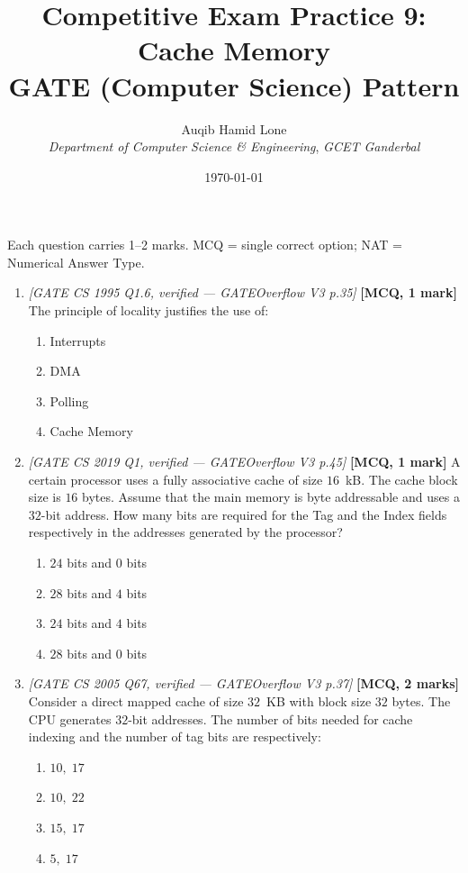 \documentclass[11pt]{article}
\title{Competitive Exam Practice 9: Cache Memory\\\large GATE (Computer Science) Pattern}
\author{Auqib Hamid Lone\\[0.3em]
  \emph{Department of Computer Science \& Engineering}, \emph{GCET Ganderbal}}
\date{\today}
\begin{document}
\maketitle

\noindent Each question carries 1--2 marks. MCQ = single correct option; NAT = Numerical Answer Type.

\begin{enumerate}
\item[\textbf{Q1}] \textit{[GATE CS 1995 Q1.6, verified --- GATEOverflow V3 p.35]} \textbf{[MCQ, 1 mark]} The principle of locality justifies the use of:
\begin{enumerate}
  \item[(A)] Interrupts
  \item[(B)] DMA
  \item[(C)] Polling
  \item[(D)] Cache Memory
\end{enumerate}

\item[\textbf{Q2}] \textit{[GATE CS 2019 Q1, verified --- GATEOverflow V3 p.45]} \textbf{[MCQ, 1 mark]} A certain processor uses a fully associative cache of size $16$~kB. The cache block size is $16$ bytes. Assume that the main memory is byte addressable and uses a $32$-bit address. How many bits are required for the Tag and the Index fields respectively in the addresses generated by the processor?
\begin{enumerate}
  \item[(A)] $24$ bits and $0$ bits
  \item[(B)] $28$ bits and $4$ bits
  \item[(C)] $24$ bits and $4$ bits
  \item[(D)] $28$ bits and $0$ bits
\end{enumerate}

\item[\textbf{Q3}] \textit{[GATE CS 2005 Q67, verified --- GATEOverflow V3 p.37]} \textbf{[MCQ, 2 marks]} Consider a direct mapped cache of size $32$~KB with block size $32$ bytes. The CPU generates $32$-bit addresses. The number of bits needed for cache indexing and the number of tag bits are respectively:
\begin{enumerate}
  \item[(A)] $10,\;17$
  \item[(B)] $10,\;22$
  \item[(C)] $15,\;17$
  \item[(D)] $5,\;17$
\end{enumerate}


\end{enumerate}
\end{document}
